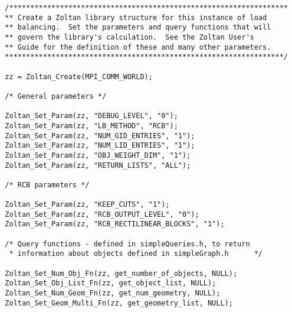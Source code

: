 \clearpage
\begin{flushleft}
\begin{verbatim}
  /******************************************************************
  ** Create a Zoltan library structure for this instance of load
  ** balancing.  Set the parameters and query functions that will
  ** govern the library's calculation.  See the Zoltan User's
  ** Guide for the definition of these and many other parameters.
  ******************************************************************/

  zz = Zoltan_Create(MPI_COMM_WORLD);

  /* General parameters */

  Zoltan_Set_Param(zz, "DEBUG_LEVEL", "0");
  Zoltan_Set_Param(zz, "LB_METHOD", "RCB");
  Zoltan_Set_Param(zz, "NUM_GID_ENTRIES", "1"); 
  Zoltan_Set_Param(zz, "NUM_LID_ENTRIES", "1");
  Zoltan_Set_Param(zz, "OBJ_WEIGHT_DIM", "1");
  Zoltan_Set_Param(zz, "RETURN_LISTS", "ALL");

  /* RCB parameters */

  Zoltan_Set_Param(zz, "KEEP_CUTS", "1"); 
  Zoltan_Set_Param(zz, "RCB_OUTPUT_LEVEL", "0");
  Zoltan_Set_Param(zz, "RCB_RECTILINEAR_BLOCKS", "1"); 

  /* Query functions - defined in simpleQueries.h, to return
   * information about objects defined in simpleGraph.h      */

  Zoltan_Set_Num_Obj_Fn(zz, get_number_of_objects, NULL);
  Zoltan_Set_Obj_List_Fn(zz, get_object_list, NULL);
  Zoltan_Set_Num_Geom_Fn(zz, get_num_geometry, NULL);
  Zoltan_Set_Geom_Multi_Fn(zz, get_geometry_list, NULL);

\end{verbatim}
\end{flushleft}

